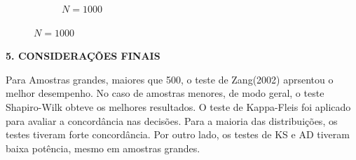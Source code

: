 \documentclass[final]{beamer}
\begin{document}
\begin{frame}[t]
\begin{columns}[t,totalwidth=0.6\paperwidth]
\begin{column}{0.45\textwidth}
\begin{figure}[H]
\begin{subfigure}[b]{0.32\textwidth}
        \caption{\(N = 1000\)}
    \end{subfigure}
\end{figure}


    





    \vspace{1.3cm}
{\large\bfseries 5. CONSIDERAÇÕES FINAIS}\par

Para Amostras grandes, maiores que 500, o teste de Zang(2002) aprsentou o melhor desempenho. No caso de amostras menores, de modo geral, o teste Shapiro-Wilk obteve os melhores resultados. O teste de Kappa-Fleis foi aplicado para avaliar a concordância nas decisões. Para a maioria das distribuições, os testes tiveram forte concordância. Por outro lado, os testes de KS e AD tiveram baixa potência, mesmo em amostras grandes.
    \vspace{1.3cm}

    
  
    \normalsize
  \end{column}
\end{columns}

\end{frame}
\end{document}
